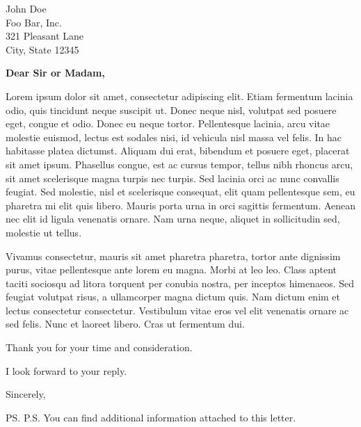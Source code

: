 \documentclass[10pt]{letter} %
\begin{document}

\begin{letter}{John Doe \\ Foo Bar, Inc. \\ 321 Pleasant Lane \\ City, State 12345} %


\opening{\textbf{Dear Sir or Madam,}}

Lorem ipsum dolor sit amet, consectetur adipiscing elit. Etiam fermentum lacinia odio, quis tincidunt neque suscipit ut. Donec neque nisl, volutpat sed posuere eget, congue et odio. Donec eu neque tortor. Pellentesque lacinia, arcu vitae molestie euismod, lectus est sodales nisi, id vehicula nisl massa vel felis. In hac habitasse platea dictumst. Aliquam dui erat, bibendum et posuere eget, placerat sit amet ipsum. Phasellus congue, est ac cursus tempor, tellus nibh rhoncus arcu, sit amet scelerisque magna turpis nec turpis. Sed lacinia orci ac nunc convallis feugiat. Sed molestie, nisl et scelerisque consequat, elit quam pellentesque sem, eu pharetra mi elit quis libero. Mauris porta urna in orci sagittis fermentum. Aenean nec elit id ligula venenatis ornare. Nam urna neque, aliquet in sollicitudin sed, molestie ut tellus.

Vivamus consectetur, mauris sit amet pharetra pharetra, tortor ante dignissim purus, vitae pellentesque ante lorem eu magna. Morbi at leo leo. Class aptent taciti sociosqu ad litora torquent per conubia nostra, per inceptos himenaeos. Sed feugiat volutpat risus, a ullamcorper magna dictum quis. Nam dictum enim et lectus consectetur consectetur. Vestibulum vitae eros vel elit venenatis ornare ac sed felis. Nunc et laoreet libero. Cras ut fermentum dui.

Thank you for your time and consideration.

I look forward to your reply.

\vspace{2\parskip} %
\closing{Sincerely,}
\vspace{2\parskip} %

\ps{P.S. You can find additional information attached to this letter.} %



\end{letter}
 
\end{document}

